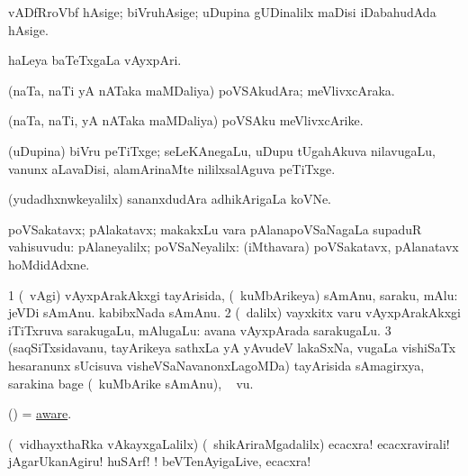 \bentry
{} 
\gl{\nA}
\expl{}
\bmng
vADfRroVbf hAsige; biVruhAsige; uDupina gUDinalilx maDisi iDabahudAda hAsige. 
\emng
\eentry

\bentry
{} 
\gl{\nA}
\expl{}
\bmng
haLeya baTeTxgaLa vAyxpAri. 
\emng
\eentry

\bentry
{} 
\gl{\nA}
\expl{}
\bmng
(naTa, naTi yA nATaka maMDaliya) poVSAkudAra; meVlivxcAraka. 
\emng
\eentry

\bentry
{} 
\gl{\nA}
\expl{}
\bmng
(naTa, naTi, yA nATaka maMDaliya) poVSAku meVlivxcArike. 
\emng
\eentry

\bentry
{} 
\gl{\nA}
\expl{}
\bmng
(uDupina) biVru peTiTxge; seLeKAnegaLu, uDupu tUgahAkuva nilavugaLu, \mo vanunx aLavaDisi, alamArinaMte nililxsalAguva peTiTxge. 
\emng
\eentry

\bentry
{} 
\gl{\nA}
\expl{}
\bmng
(yudadhxnwkeyalilx) sananxdudAra adhikArigaLa koVNe. 
\emng
\eentry

\bentry
{} 
\gl{\nA}
\expl{}
\bmng
poVSakatavx; pAlakatavx; makakxLu \mo vara pAlanapoVSaNagaLa supaduR vahisuvudu:  pAlaneyalilx; poVSaNeyalilx:  (iMthavara) poVSakatavx, pAlanatavx hoMdidAdxne. 
\emng
\eentry

\bentry
{} 
\gl{\nA}
\expl{}
\bmng
\bnum
\num{1} (\kanmu\ \saupa vAgi) vAyxpArakAkxgi tayArisida, (\kanmu\ kuMbArikeya) sAmAnu, saraku, mAlu:  jeVDi sAmAnu.  kabibxNada sAmAnu. 
\num{2} (\sA\ \bava dalilx) vayxkitx \mo varu vAyxpArakAkxgi iTiTxruva sarakugaLu, mAlugaLu:  avana vAyxpArada sarakugaLu. 
\num{3} (saqSiTxsidavanu, tayArikeya sathxLa yA yAvudeV lakaSxNa, \mo vugaLa vishiSaTx hesaranunx sUcisuva visheVSaNavanonxLagoMDa) tayArisida sAmagirxya, sarakina bage (\kanmu\ kuMbArike sAmAnu), \udA\  \mo vu. 
\enum
\emng
\eentry

\bentry
{} 
\gl{\Agu}
\expl{}
\bmng
(\kAparx) = \hyperref{kandict_a.pdf}{A}{aware}{aware}. 
\emng
\eentry

\bentry
{} 
\gl{\sakirx}
\expl{}
\bmng
(\kanmu\ vidhayxthaRka vAkayxgaLalilx) (\kanmu\ shikAriraMgadalilx) ecacxra! ecacxravirali! jAgarUkanAgiru! huSArf! ! beVTenAyigaLive, ecacxra! 
\emng
\eentry

